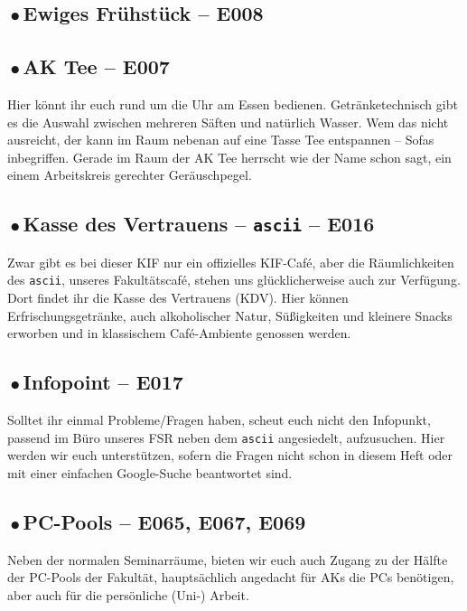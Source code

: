 \subsection*{{\,\color{ShirtAttendee}$\bullet$\,}Ewiges Frühstück -- E008}


\subsection*{{\,\color{ShirtAttendee}$\bullet$\,}AK Tee -- E007}
Hier könnt ihr euch rund um die Uhr am Essen bedienen.
Getränketechnisch gibt es die Auswahl zwischen mehreren Säften und natürlich Wasser.
Wem das nicht ausreicht, der kann im Raum nebenan auf eine Tasse Tee entspannen -- Sofas inbegriffen.
Gerade im Raum der AK Tee herrscht wie der Name schon sagt, ein einem Arbeitskreis gerechter Geräuschpegel.

\subsection*{{\,\color{ShirtAttendee}$\bullet$\,}Kasse des Vertrauens -- \texttt{ascii} -- E016}
Zwar gibt es bei dieser KIF nur ein offizielles KIF-Café, aber die Räumlichkeiten des \texttt{ascii}, unseres Fakultätscafé, stehen uns glücklicherweise auch zur Verfügung.
Dort findet ihr die Kasse des Vertrauens (KDV).
Hier können Erfrischungsgetränke, auch alkoholischer Natur, Süßigkeiten und kleinere Snacks erworben und in klassischem Café-Ambiente genossen werden.

\subsection*{{\,\color{ShirtAttendee}$\bullet$\,}Infopoint -- E017}
Solltet ihr einmal Probleme/Fragen haben, scheut euch nicht den Infopunkt, passend im Büro unseres FSR neben dem \texttt{ascii} angesiedelt, aufzusuchen.
Hier werden wir euch unterstützen, sofern die Fragen nicht schon in diesem Heft oder mit einer einfachen Google-Suche beantwortet sind.

\subsection*{{\,\color{ShirtAttendee}$\bullet$\,}PC-Pools -- E065, E067, E069}
Neben der normalen Seminarräume, bieten wir euch auch Zugang zu der Hälfte der PC-Pools der Fakultät, hauptsächlich angedacht für AKs die PCs benötigen, aber auch für die persönliche (Uni-) Arbeit.

